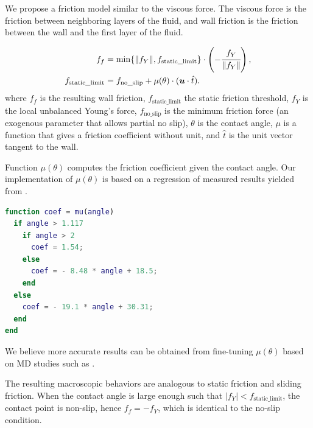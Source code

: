 \documentclass{jfm}
\begin{document}
We propose a friction model similar to the viscous force. The viscous force is the friction between neighboring layers of the fluid, and wall friction is the friction between the wall and the first layer of the fluid.

\begin{align}
f_f & = \min \{ \lVert f_Y \rVert, f_\text{static\_limit} \}
\cdot \left(
    -\cfrac{f_Y}{ \lVert f_Y \rVert }
\right), \\
f_\text{static\_limit} & =
f_\text{no\_slip} + \mu(\theta)
\cdot (
    \bm{u} \cdot \hat{t}
). \label{eq:friction}
\end{align}
where $f_f$ is the resulting wall friction, $f_\text{static\_limit}$ the static friction threshold, $f_Y$ is the local unbalanced Young's force, $f_\text{no\_slip}$ is the minimum friction force (an exogenous parameter that allows partial no slip), $\theta$ is the contact angle, $\mu$ is a function that gives a friction coefficient without unit, and $\hat{t}$ is the unit vector tangent to the wall. 

Function $\mu(\theta)$ computes the friction coefficient given the contact angle. Our implementation of $\mu(\theta)$ is based on a regression of measured results yielded from \cite{MD_2018_its_the_bonds}. 
\begin{lstlisting}[language=Matlab, caption = {Function $\mu$}]
function coef = mu(angle)
  if angle > 1.117
    if angle > 2
      coef = 1.54;
    else
      coef = - 8.48 * angle + 18.5;
    end
  else
    coef = - 19.1 * angle + 30.31;
  end
end
\end{lstlisting}

We believe more accurate results can be obtained from fine-tuning $\mu(\theta)$ based on MD studies such as \cite{MD_navier}. 

The resulting macroscopic behaviors are analogous to static friction and sliding friction. When the contact angle is large enough such that $|f_Y| < f_\text{static\_limit}$, the contact point is non-slip, hence $f_f = -f_Y$, which is identical to the no-slip condition. 
\end{document}
